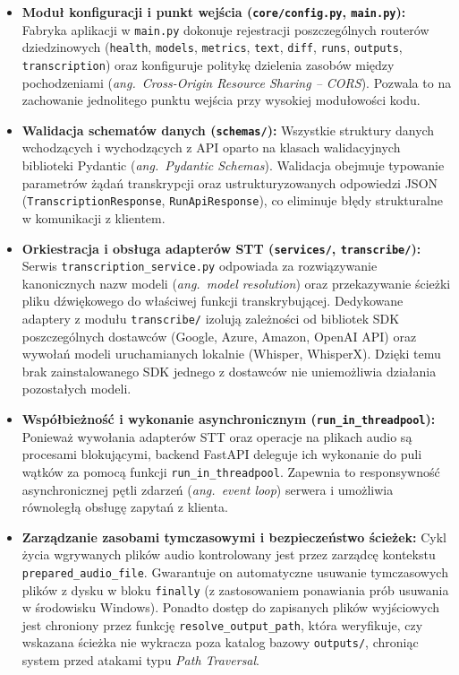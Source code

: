 \begin{itemize}
    \item \textbf{Moduł konfiguracji i punkt wejścia (\texttt{core/config.py}, \texttt{main.py}):}
    Fabryka aplikacji w \texttt{main.py} dokonuje rejestracji poszczególnych routerów dziedzinowych (\texttt{health}, \texttt{models}, \texttt{metrics}, \texttt{text}, \texttt{diff}, \texttt{runs}, \texttt{outputs}, \texttt{transcription}) oraz konfiguruje politykę dzielenia zasobów między pochodzeniami (\textit{ang.~Cross-Origin Resource Sharing -- CORS}). Pozwala to na zachowanie jednolitego punktu wejścia przy wysokiej modułowości kodu.

    \item \textbf{Walidacja schematów danych (\texttt{schemas/}):}
    Wszystkie struktury danych wchodzących i wychodzących z API oparto na klasach walidacyjnych biblioteki Pydantic (\textit{ang.~Pydantic Schemas}). Walidacja obejmuje typowanie parametrów żądań transkrypcji oraz ustrukturyzowanych odpowiedzi JSON (\texttt{TranscriptionResponse}, \texttt{RunApiResponse}), co eliminuje błędy strukturalne w komunikacji z klientem.

    \item \textbf{Orkiestracja i obsługa adapterów STT (\texttt{services/}, \texttt{transcribe/}):}
    Serwis \texttt{transcription\_service.py} odpowiada za rozwiązywanie kanonicznych nazw modeli (\textit{ang.~model resolution}) oraz przekazywanie ścieżki pliku dźwiękowego do właściwej funkcji transkrybującej. Dedykowane adaptery z modułu \texttt{transcribe/} izolują zależności od bibliotek SDK poszczególnych dostawców (Google, Azure, Amazon, OpenAI API) oraz wywołań modeli uruchamianych lokalnie (Whisper, WhisperX). Dzięki temu brak zainstalowanego SDK jednego z dostawców nie uniemożliwia działania pozostałych modeli.

    \item \textbf{Współbieżność i wykonanie asynchronicznym  (\texttt{run\_in\_threadpool}):}
    Ponieważ wywołania adapterów STT oraz operacje na plikach audio są procesami blokującymi, backend FastAPI deleguje ich wykonanie do puli wątków za pomocą funkcji \texttt{run\_in\_threadpool}. Zapewnia to responsywność asynchronicznej pętli zdarzeń (\textit{ang.~event loop}) serwera i umożliwia równoległą obsługę zapytań z klienta.

    \item \textbf{Zarządzanie zasobami tymczasowymi i bezpieczeństwo ścieżek:}
    Cykl życia wgrywanych plików audio kontrolowany jest przez zarządcę kontekstu \texttt{prepared\_}\allowbreak\texttt{audio\_}\allowbreak\texttt{file}. Gwarantuje on automatyczne usuwanie tymczasowych plików z dysku w bloku \texttt{finally} (z zastosowaniem ponawiania prób usuwania w środowisku Windows). Ponadto dostęp do zapisanych plików wyjściowych jest chroniony przez funkcję \texttt{resolve\_}\allowbreak\texttt{output\_path}, która weryfikuje, czy wskazana ścieżka nie wykracza poza katalog bazowy \texttt{outputs/}, chroniąc system przed atakami typu \textit{Path Traversal}.


\end{itemize}
